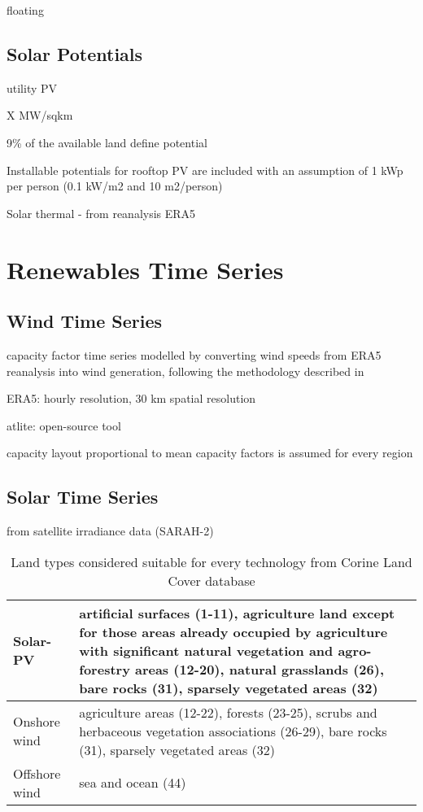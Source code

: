 floating

\subsection{Solar Potentials}

utility PV

X MW/sqkm

9\% of the available land define potential

Installable potentials for rooftop PV are included with an assumption of 1 kWp
per person (0.1 kW/m2 and 10 m2/person)


Solar thermal
- from reanalysis ERA5

\section{Renewables Time Series}

\subsection{Wind Time Series}

capacity factor time series modelled by converting wind speeds from ERA5 reanalysis into wind
generation, following the methodology described in

ERA5: hourly resolution, 30 km spatial resolution

atlite: open-source tool

capacity layout proportional to mean capacity factors is assumed for every region


\subsection{Solar Time Series}

from satellite irradiance data (SARAH-2)

\begin{table}
    \caption{Land types considered suitable for every technology from Corine Land Cover database}
    \small
    \begin{tabularx}{\textwidth}{lX}
        \toprule
        Solar-PV & artificial surfaces (1-11), agriculture land except for those
        areas already occupied by agriculture with significant natural
        vegetation and agro-forestry areas (12-20), natural grasslands (26), bare rocks (31),
        sparsely vegetated areas (32) \\ \midrule
        Onshore wind & agriculture areas (12-22), forests (23-25), scrubs and herbaceous vegetation associations (26-29), bare rocks (31), sparsely vegetated areas (32) \\ \midrule
        Offshore wind & sea and ocean (44) \\ \bottomrule
    \end{tabularx}
\end{table}

